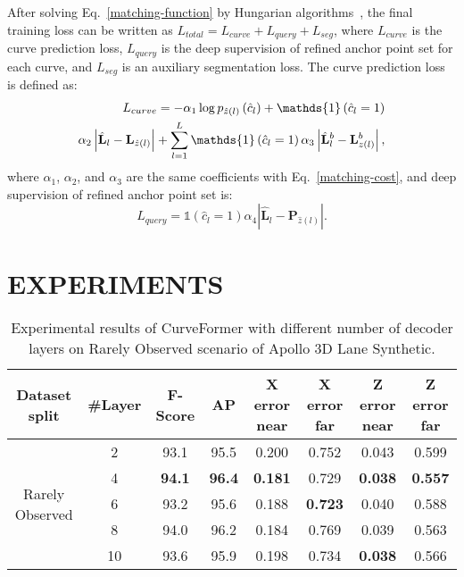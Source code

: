 \documentclass[letterpaper, 10 pt, conference]{ieeeconf}
\newcommand{\bL}{\mathbf{L}}
\newcommand{\bP}{\mathbf{P}}
\begin{document}
After solving Eq.~\ref{matching-function} by Hungarian algorithms~\cite{carion2020end}, the final training loss can be written as $L_{total}=L_{curve} + L_{query} + L_{seg}$, where $L_{curve}$ is the curve prediction loss, $L_{query}$ is the deep supervision of refined anchor point set for each curve, and $L_{seg}$ is an auxiliary segmentation loss.
The curve prediction loss is defined as:
\begin{align}
    L_{curve}= -\alpha_1 \log p_{\hat{z}(l)}\left(\hat{c}_l\right) + \mathds{1}\left(\hat{c}_l=1\right) \notag \\ \alpha_2\left|\hat{\bL}_l-\bL_{\hat{z}(l)}\right| 
    + \sum_{l=1}^L \mathds{1}\left(\hat{c}_l=1\right) \alpha_3 \left|\hat{\bL}_l^b-\bL_{z(l)}^{b}\right|,
\label{3D-loss}
\end{align}
where $\alpha_1$, $\alpha_2$, and $\alpha_3$ are the same coefficients with Eq.~\ref{matching-cost}, and deep supervision of refined anchor point set is:
\begin{equation}
    L_{query} = \mathds{1}\left(\hat{c}_l=1\right) \alpha_4\left|\hat{\bL}_l - \bP_{\hat{z}(l)}\right|.
\label{point-loss}
\end{equation}


\section{EXPERIMENTS}

\begin{table*}[t]
  \begin{center}
  \begin{scriptsize}
    \caption{Experimental results of CurveFormer with different number of decoder layers on Rarely Observed scenario of Apollo 3D Lane Synthetic.}
    \label{tab:decoder-layer}
    \begin{tabular}{c|c|cccccc}
    \toprule
      Dataset split & \#Layer & F-Score & AP & X error near & X error far & Z error near & Z error far \\
      \midrule
      \multicolumn{1}{c|}{\multirow{5}{5em}{Rarely Observed}}
      & 2 & 93.1 & 95.5 & 0.200 & 0.752 & 0.043 & 0.599 \\
      & 4 & \textbf{94.1} & \textbf{96.4} & \textbf{0.181} & 0.729 & \textbf{0.038} & \textbf{0.557} \\
      & 6 & 93.2 & 95.6 & 0.188 & \textbf{0.723} & 0.040 & 0.588 \\
      & 8 & 94.0 & 96.2 & 0.184 & 0.769 & 0.039 & 0.563 \\
      & 10 & 93.6 & 95.9 & 0.198 & 0.734 & \textbf{0.038} & 0.566 \\
      \bottomrule
    \end{tabular}
    \end{scriptsize}
  \end{center}
\end{table*}
\end{document}
